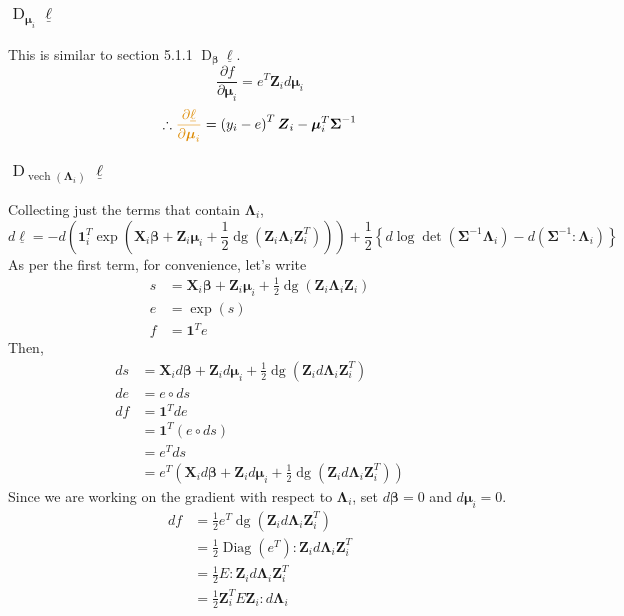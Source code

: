 \documentclass[11pt]{article}
\newcommand{\bs}{\boldsymbol}
\newcommand{\opn}{\operatorname}
\begin{document}
\subsubsection{$\opn{D}_{\bs{\mu}_{i}}\underline{\ell}$}
This is similar to section 5.1.1 $\opn{D}_{\bs{\beta}}\underline{\ell}$.
$$
  \frac{\partial f}{\partial \bs{\mu}_{i}} = e^{T}\bs{Z}_{i}d\bs{\mu}_{i}
$$
$$
  \therefore \textcolor{myorange}{\frac{\partial \underline{\ell}}{\partial \bs{\mu}_{i}}} = \left(y_{i} - e\right)^{T}\bs{Z}_{i} - \bs{\mu}_{i}^{T}\bs{\Sigma}^{-1}
$$
\subsubsection{$\opn{D}_{\opn{vech}\left(\bs{\Lambda}_{i} \right)}\underline{\ell} $}
Collecting just the terms that contain $\bs{\Lambda}_{i}$,
$$
  d\underline{\ell} = -d\left(\bs{1}_{i}^{T}\exp \left(\bs{X}_{i}\bs{\beta}+ \bs{Z}_{i}\bs{\mu}_{i}+ \frac{1}{2} \opn{dg}\left(\bs{Z}_{i}\bs{\Lambda}_{i}\bs{Z}_{i}^{T} \right) \right)\right) + \frac{1}{2}\left\{d\log \det \left(\bs{\Sigma}^{-1}\bs{\Lambda}_{i} \right) - d\left(\bs{\Sigma}^{-1}: \bs{\Lambda}_{i} \right) \right\}
$$
As per the first term, for convenience, let's write 
\begin{align*}
  s &= \bs{X}_{i}\bs{\beta} + \bs{Z}_{i}\bs{\mu}_{i} + \frac{1}{2}\opn{dg}\left(\bs{Z}_{i}\bs{\Lambda}_{i}\bs{Z}_{i} \right)\\
  e &= \exp \left(s \right)\\
  f &= \bs{1}^{T}e
\end{align*}
Then,
\begin{align*}
  ds &= \bs{X}_{i}d\bs{\beta} + \bs{Z}_{i}d\bs{\mu}_{i} + \frac{1}{2}\opn{dg}\left(\bs{Z}_{i}d\bs{\Lambda}_{i}\bs{Z}_{i}^{T} \right)\\
  de &= e \circ ds\\
  df &= \bs{1}^{T}de\\
  &= \bs{1}^{T}\left(e \circ ds \right)\\
  &= e^{T}ds\\
  &= e^{T}\left(\bs{X}_{i}d\bs{\beta} + \bs{Z}_{i}d\bs{\mu}_{i} + \frac{1}{2}\opn{dg}\left(\bs{Z}_{i}d\bs{\Lambda}_{i}\bs{Z}_{i}^{T} \right) \right)
\end{align*}
Since we are working on the gradient with respect to $\bs{\Lambda}_{i}$, set $d\bs{\beta}=0$ and $d\bs{\mu}_{i}=0$.
\begin{align*}
  df &= \frac{1}{2}e^{T}\opn{dg}\left(\bs{Z}_{i}d\bs{\Lambda}_{i}\bs{Z}_{i}^{T} \right)\\
  &= \frac{1}{2}\opn{Diag}\left(e^{T}\right): \bs{Z}_{i}d\bs{\Lambda}_{i}\bs{Z}_{i}^{T}\\
  &= \frac{1}{2}E: \bs{Z}_{i}d\bs{\Lambda}_{i}\bs{Z}_{i}^{T}\\
  &= \frac{1}{2} \bs{Z}_{i}^{T}E\bs{Z}_{i}: d\bs{\Lambda}_{i}
\end{align*}
\end{document}
